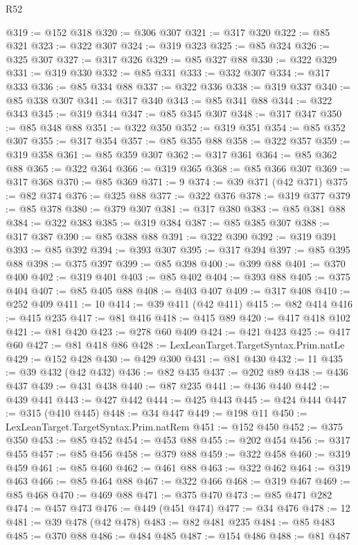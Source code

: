 \begin{lexlean}{R52}
\begin{coremodule}
@319 := @152 @318
@320 := @306 @307
@321 := @317 @320
@322 := @85 @321
@323 := @322 @307
@324 := @319 @323
@325 := @85 @324
@326 := @325 @307
@327 := @317 @326
@329 := @85 @327 @88
@330 := @322 @329
@331 := @319 @330
@332 := @85 @331
@333 := @332 @307
@334 := @317 @333
@336 := @85 @334 @88
@337 := @322 @336
@338 := @319 @337
@340 := @85 @338 @307
@341 := @317 @340
@343 := @85 @341 @88
@344 := @322 @343
@345 := @319 @344
@347 := @85 @345 @307
@348 := @317 @347
@350 := @85 @348 @88
@351 := @322 @350
@352 := @319 @351
@354 := @85 @352 @307
@355 := @317 @354
@357 := @85 @355 @88
@358 := @322 @357
@359 := @319 @358
@361 := @85 @359 @307
@362 := @317 @361
@364 := @85 @362 @88
@365 := @322 @364
@366 := @319 @365
@368 := @85 @366 @307
@369 := @317 @368
@370 := @85 @369
@371 := 9
@374 := @39 @371 (@42 @371)
@375 := @82 @374
@376 := @325 @88
@377 := @322 @376
@378 := @319 @377
@379 := @85 @378
@380 := @379 @307
@381 := @317 @380
@383 := @85 @381 @88
@384 := @322 @383
@385 := @319 @384
@387 := @85 @385 @307
@388 := @317 @387
@390 := @85 @388 @88
@391 := @322 @390
@392 := @319 @391
@393 := @85 @392
@394 := @393 @307
@395 := @317 @394
@397 := @85 @395 @88
@398 := @375 @397
@399 := @85 @398
@400 := @399 @88
@401 := @370 @400
@402 := @319 @401
@403 := @85 @402
@404 := @393 @88
@405 := @375 @404
@407 := @85 @405 @88
@408 := @403 @407
@409 := @317 @408
@410 := @252 @409
@411 := 10
@414 := @39 @411 (@42 @411)
@415 := @82 @414
@416 := @415 @235
@417 := @81 @416
@418 := @415 @89
@420 := @417 @418 @102
@421 := @81 @420
@423 := @278 @60 @409
@424 := @421 @423
@425 := @417 @60
@427 := @81 @418 @86
@428 := LexLeanTarget.TargetSyntax.Prim.natLe
@429 := @152 @428
@430 := @429 @300
@431 := @81 @430
@432 := 11
@435 := @39 @432 (@42 @432)
@436 := @82 @435
@437 := @202 @89
@438 := @436 @437
@439 := @431 @438
@440 := @87 @235
@441 := @436 @440
@442 := @439 @441
@443 := @427 @442
@444 := @425 @443
@445 := @424 @444
@447 := @315 (@410 @445)
@448 := @34 @447
@449 := @198 @11
@450 := LexLeanTarget.TargetSyntax.Prim.natRem
@451 := @152 @450
@452 := @375 @350
@453 := @85 @452
@454 := @453 @88
@455 := @202 @454
@456 := @317 @455
@457 := @85 @456
@458 := @379 @88
@459 := @322 @458
@460 := @319 @459
@461 := @85 @460
@462 := @461 @88
@463 := @322 @462
@464 := @319 @463
@466 := @85 @464 @88
@467 := @322 @466
@468 := @319 @467
@469 := @85 @468
@470 := @469 @88
@471 := @375 @470
@473 := @85 @471 @282
@474 := @457 @473
@476 := @449 (@451 @474)
@477 := @34 @476
@478 := 12
@481 := @39 @478 (@42 @478)
@483 := @82 @481 @235
@484 := @85 @483
@485 := @370 @88
@486 := @484 @485
@487 := @154 @486
@488 := @81 @487

\end{coremodule}
\end{lexlean}
